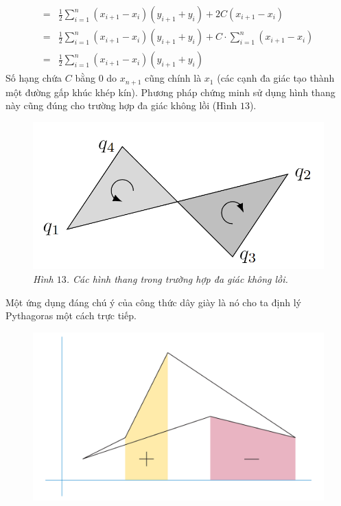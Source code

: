 \begin{multicols}{2}
\begin{align*}
		= &\frac{1}{2}\sum\limits_{i = 1}^n \left( {{x_{i + 1}} - {x_i}} \right)\left( {{y_{i + 1}} + {y_i}} \right) + 2C\left( {{x_{i + 1}} - {x_i}} \right) \\
		= &\frac{1}{2} \sum\limits_{i = 1}^n \left( {{x_{i + 1}} - {x_i}} \right)\left( {{y_{i + 1}} + {y_i}} \right) + C \cdot \sum\limits_{i = 1}^n {\left( {{x_{i + 1}} - {x_i}} \right)}  \\
	= &\frac{1}{2}\sum\limits_{i = 1}^n {\left( {{x_{i + 1}} - {x_i}} \right)\left( {{y_{i + 1}} + {y_i}} \right)} 
	\end{align*}
	Số hạng chứa $C$ bằng $0$ do $x_{n+1}$ cũng chính là $x_1$ (các cạnh đa giác tạo thành một đường gấp khúc khép kín). Phương pháp chứng minh sử dụng hình thang này cũng đúng cho trường hợp đa giác không lồi (Hình $13$).
	\begin{figure}[H]
		\vspace*{-10pt}
		\centering
		\captionsetup{labelformat= empty, justification=centering}
		\includegraphics[width= 0.9\linewidth]{16}
		\caption{\small\textit{\color{toanhocdoisong}Hình $13$. Các hình thang trong trường hợp đa giác không lồi.}}
		\vspace*{-10pt}
	\end{figure}
	Một ứng dụng đáng chú ý của công thức dây giày là nó cho ta định lý Pythagoras một cách trực tiếp. 
	\begin{figure}[H]
		\vspace*{-5pt}
		\centering
		\captionsetup{labelformat= empty, justification=centering}
		\includegraphics[width= 0.9\linewidth]{17}

\end{figure}
\end{multicols}
